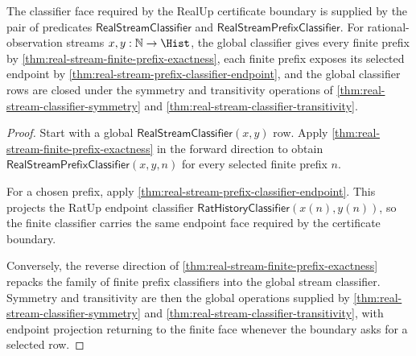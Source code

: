 \begin{theorem}
\label{thm:real-stream-prefix-classifier-obligation}
The classifier face required by the RealUp certificate boundary is supplied by
the pair of predicates $\mathsf{RealStreamClassifier}$ and
$\mathsf{RealStreamPrefixClassifier}$. For rational-observation streams
$x,y:\mathbb{N}\to\Hist$, the global classifier gives every finite prefix by
\autoref{thm:real-stream-finite-prefix-exactness}, each finite prefix exposes
its selected endpoint by
\autoref{thm:real-stream-prefix-classifier-endpoint}, and the global
classifier rows are closed under the symmetry and transitivity operations of
\autoref{thm:real-stream-classifier-symmetry} and
\autoref{thm:real-stream-classifier-transitivity}.
\end{theorem}
\begin{proof}
Start with a global $\mathsf{RealStreamClassifier}(x,y)$ row. Apply
\autoref{thm:real-stream-finite-prefix-exactness} in the forward direction to
obtain $\mathsf{RealStreamPrefixClassifier}(x,y,n)$ for every selected finite
prefix $n$.

For a chosen prefix, apply
\autoref{thm:real-stream-prefix-classifier-endpoint}. This projects the
RatUp endpoint classifier
$\mathsf{RatHistoryClassifier}(x(n),y(n))$, so the finite classifier carries
the same endpoint face required by the certificate boundary.

Conversely, the reverse direction of
\autoref{thm:real-stream-finite-prefix-exactness} repacks the family of finite
prefix classifiers into the global stream classifier. Symmetry and
transitivity are then the global operations supplied by
\autoref{thm:real-stream-classifier-symmetry} and
\autoref{thm:real-stream-classifier-transitivity}, with endpoint projection
returning to the finite face whenever the boundary asks for a selected row.
\end{proof}

